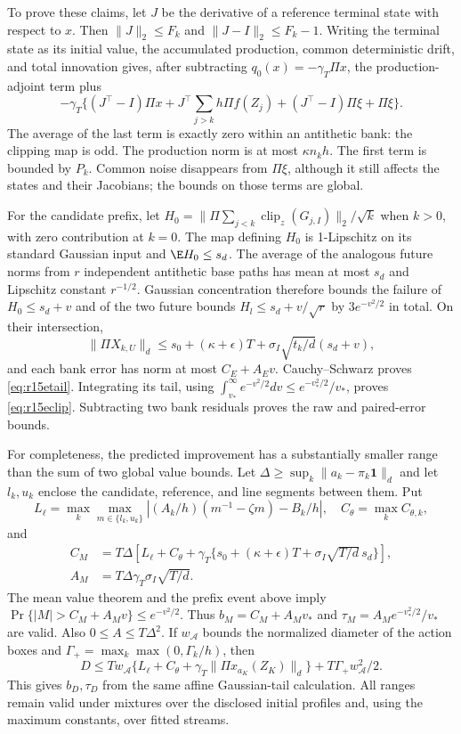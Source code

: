To prove these claims, let $J$ be the derivative of a reference
terminal state with respect to $x$. Then
$\|J\|_2\leq F_k$ and $\|J-I\|_2\leq F_k-1$.
Writing the terminal state as its initial value, the accumulated
production, common deterministic drift, and total innovation gives,
after subtracting $q_0(x)=-\gamma_T\Pi x$, the production-adjoint
term plus
\[
 -\gamma_T\{(J^\top-I)\Pi x
           +J^\top\textstyle\sum_{j>k}h\Pi f(Z_j)
           +(J^\top-I)\Pi\xi+\Pi\xi\}.
\]
The average of the last term is exactly zero within an antithetic bank:
the clipping map is odd. The production norm is at most
$\kappa n_kh$. The first term is bounded by $P_k$.
Common noise disappears from $\Pi\xi$, although it still affects the
states and their Jacobians; the bounds on those terms are global.

For the candidate prefix, let
$H_0=\|\Pi\sum_{j<k}\operatorname{clip}_{z}(G_{j,I})\|_2/\sqrt k$
when $k>0$, with zero contribution at $k=0$. The map defining $H_0$
is 1-Lipschitz on its standard Gaussian input and
$\E H_0\leq s_d$. The average of the analogous future norms from
$r$ independent antithetic base paths has mean at most $s_d$ and
Lipschitz constant $r^{-1/2}$. Gaussian concentration therefore bounds
the failure of
$H_0\leq s_d+v$ and of the two future bounds
$H_l\leq s_d+v/\sqrt r$ by $3e^{-v^2/2}$ in total.
On their intersection,
\[
 \|\Pi X_{k,U}\|_d\leq s_0+(\kappa+\epsilon)T
                  +\sigma_I\sqrt{t_k/d}(s_d+v),
\]
and each bank error has norm at most $C_E+A_Ev$.
Cauchy--Schwarz proves \eqref{eq:r15etail}. Integrating its tail,
using $\int_{v_*}^{\infty}e^{-v^2/2}dv\leq e^{-v_*^2/2}/v_*$,
proves \eqref{eq:r15eclip}. Subtracting two bank residuals proves the
raw and paired-error bounds.

For completeness, the predicted improvement has a substantially
smaller range than the sum of two global value bounds. Let
$\Delta\geq\sup_k\|a_k-\pi_k\bm1\|_d$ and let $l_k,u_k$ enclose
the candidate, reference, and line segments between them. Put
\[
 L_\ell=\max_k\max_{m\in\{l_k,u_k\}}
       |(A_k/h)(m^{-1}-\zeta m)-B_k/h|,
 \quad C_\theta=\max_k C_{\theta,k},
\]
and
\begin{align*}
 C_M&=T\Delta\left[L_\ell+C_\theta+
       \gamma_T\{s_0+(\kappa+\epsilon)T+
                        \sigma_I\sqrt{T/d}\,s_d\}\right],\\
 A_M&=T\Delta\gamma_T\sigma_I\sqrt{T/d}.
\end{align*}
The mean value theorem and the prefix event above imply
$\Pr\{|M|>C_M+A_Mv\}\leq e^{-v^2/2}$.
Thus $b_M=C_M+A_Mv_*$ and
$\tau_M=A_Me^{-v_*^2/2}/v_*$ are valid. Also
$0\leq A\leq T\Delta^2$. If $w_{\mathcal A}$ bounds the normalized
diameter of the action boxes and
$\Gamma_+=\max_k\max(0,\Gamma_k/h)$, then
\[
 D\leq T w_{\mathcal A}
       \{L_\ell+C_\theta+\gamma_T\|\Pi x_{a_K}(Z_K)\|_d\}
                    +T\Gamma_+w_{\mathcal A}^2/2.
\]
This gives $b_D,\tau_D$ from the same affine Gaussian-tail calculation.
All ranges remain valid under mixtures over the disclosed initial
profiles and, using the maximum constants, over fitted streams.

